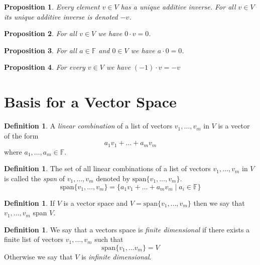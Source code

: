 \documentclass[12pt,letterpaper]{amsart}
\theoremstyle{plain}
\newtheorem{proposition}{Proposition}[section]
\theoremstyle{definition}
\newtheorem{definition}[theorem]{Definition}
\numberwithin{equation}{section}
\begin{document}
\begin{proposition}Every element $v\in V$ has a unique additive inverse. For all $v\in V$ its unique additive inverse is denoted $-v$. 
\end{proposition}

\begin{proposition}For all $v\in V$ we have $0\cdot v=0$. 
\end{proposition}

\begin{proposition}For all $a\in \mathbb{F}$ and $0\in V$ we have $a\cdot 0=0$.
\end{proposition}

\begin{proposition}For every $v\in V$ we have $(-1)\cdot v=-v$
\end{proposition}

\section{Basis for a Vector Space}

\begin{definition} A \emph{linear combination} of a list of vectors $v_1,\ldots, v_m$ in $V$ is a vector of the form 
\[a_1v_1+\ldots+a_mv_m\]
where $a_1,\ldots, a_m\in \mathbb{F}$. 
\end{definition}

\begin{definition} The set of all linear combinations of a list of vectors $v_1, \ldots, v_m$ in $V$ is called the \emph{span} of $v_1, \ldots,v_m$ denoted by 
$\text{span}\{v_1,\ldots,v_m\}$.
\[\text{span}\{v_1,\ldots,v_m\}=\{a_1v_1+\ldots+a_mv_m\mid a_i\in \mathbb{F}\}\]
\end{definition}

\begin{definition} If $V$ is a vector space and $V=\text{span}\{v_1,\ldots,v_m\}$ then we say that $v_1, \ldots, v_m$ span $V$. 
\end{definition}

\begin{definition} We say that a vectors space is \emph{finite dimensional} if there exists a finite list of vectors $v_1,\ldots, v_m$ such that 
\[\text{span}\{v_1,\ldots v_m\}=V\] 
Otherwise we say that $V$ is \emph{infinite dimensional}.
\end{definition}
\end{document}
